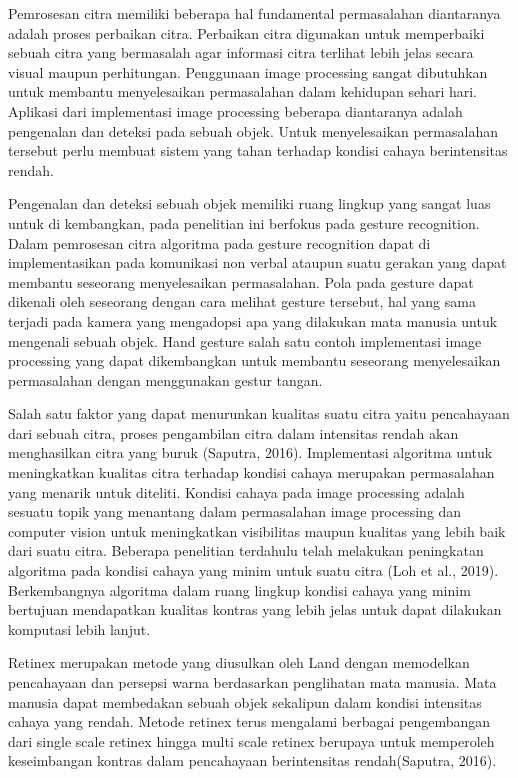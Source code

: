 Pemrosesan citra memiliki beberapa hal fundamental permasalahan diantaranya adalah proses perbaikan citra. Perbaikan citra digunakan untuk memperbaiki sebuah citra yang bermasalah agar informasi citra terlihat lebih jelas secara visual maupun perhitungan. Penggunaan image processing sangat dibutuhkan untuk membantu menyelesaikan permasalahan dalam kehidupan sehari hari. Aplikasi dari implementasi image processing beberapa diantaranya adalah pengenalan dan deteksi pada sebuah objek. Untuk menyelesaikan permasalahan tersebut perlu membuat sistem yang tahan terhadap kondisi cahaya berintensitas rendah.

Pengenalan dan deteksi sebuah objek memiliki ruang lingkup yang sangat luas untuk di kembangkan, pada penelitian ini berfokus pada gesture recognition.
Dalam pemrosesan citra algoritma pada gesture recognition dapat di implementasikan pada komunikasi non verbal ataupun suatu gerakan yang dapat membantu seseorang menyelesaikan permasalahan. Pola pada gesture dapat dikenali oleh seseorang dengan cara melihat gesture tersebut, hal yang sama terjadi pada kamera yang mengadopsi apa yang dilakukan mata manusia untuk mengenali sebuah objek. 
Hand gesture salah satu contoh implementasi image processing yang dapat dikembangkan untuk membantu seseorang menyelesaikan permasalahan dengan menggunakan gestur tangan. 

Salah satu faktor yang dapat menurunkan kualitas suatu citra yaitu pencahayaan dari sebuah citra, proses pengambilan citra dalam intensitas rendah akan menghasilkan citra yang buruk (Saputra, 2016).
Implementasi algoritma untuk meningkatkan kualitas citra terhadap kondisi cahaya merupakan permasalahan yang menarik untuk diteliti.
Kondisi cahaya pada image processing adalah sesuatu topik yang menantang dalam permasalahan image processing dan computer vision untuk meningkatkan visibilitas maupun kualitas yang lebih baik dari suatu citra. 
Beberapa penelitian terdahulu telah melakukan peningkatan algoritma pada kondisi cahaya yang minim untuk suatu citra (Loh et al., 2019). 
Berkembangnya algoritma dalam ruang lingkup kondisi cahaya yang minim bertujuan mendapatkan kualitas kontras yang lebih jelas untuk dapat dilakukan komputasi lebih lanjut.

Retinex merupakan metode yang diusulkan oleh Land dengan memodelkan pencahayaan dan persepsi warna berdasarkan penglihatan mata manusia. Mata manusia dapat membedakan sebuah objek sekalipun dalam kondisi intensitas cahaya yang rendah. Metode retinex terus mengalami berbagai pengembangan dari single scale retinex hingga multi scale retinex berupaya untuk memperoleh keseimbangan kontras dalam pencahayaan berintensitas rendah(Saputra, 2016).

